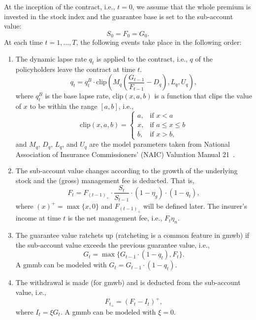 At the inception of the contract, i.e., $t=0$, we assume that the whole premium is invested in the stock index and the guarantee base is set to the sub-account value:
\begin{equation*}
    S_0=F_0=G_0.
\end{equation*}
At each time $t=1,\ldots,T$, the following events take place in the following order:
\begin{enumerate}
    \item The dynamic lapse rate $q_t$ is applied to the contract, i.e., $q$ of the policyholders leave the contract at time $t$.
        \begin{equation} \label{eq3:lapse}
            q_t = q_t^B \cdot \text{clip} (M_q (\frac{G_{t-1}}{F_{t-1}} - D_q), L_q, U_q),
        \end{equation}
    where $q_t^B$ is the base lapse rate, $\text{clip}(x, a, b)$ is a function that clips the value of $x$ to be within the range $[a, b]$, i.e.,
    $$
    \text{clip}(x, a, b) = \begin{cases}
        a, & \text{if } x < a \\
        x, & \text{if } a \leq x \leq b \\
        b, & \text{if } x > b,
    \end{cases}
    $$
    and $M_q$, $D_q$, $L_q$, and $U_q$ are the model parameters taken from National Association of Insurance Commissioners’ (NAIC) Valuation Manual 21~\citep{naic2021}.
    \item The sub-account value changes according to the growth of the underlying stock and the (gross) management fee is deducted. That is, 
        \begin{equation} \label{eq3:subaccount}
            F_t = F_{(t-1)_+}\cdot\frac{S_{t}}{S_{t-1}}\cdot(1-\eta_g)\cdot(1-q_t),
        \end{equation} 
    where $(x)^+=\max\{x,0\}$ and $F_{(t-1)_+}$ will be defined later. The insurer's income at time $t$ is the net management fee, i.e., $F_t\eta_n$. 

    \item The guarantee value ratchets up (ratcheting is a common feature in \gls{gmwb}) if the sub-account value exceeds the previous guarantee value, i.e., 
        \begin{equation} \label{eq3:guarantee}
            G_t = \max\{G_{t-1}\cdot(1-q_t),F_t\}.
        \end{equation} 
    A \gls{gmmb} can be modeled with $G_t = G_{t-1}\cdot(1-q_t)$.

    \item The withdrawal is made (for \gls{gmwb}) and is deducted from the sub-account value, i.e., 
        \begin{equation} \label{eq3:withdrawal}
            F_{t_+} = (F_t - I_t)^+,
        \end{equation} 
    where $I_t = \xi G_t$. A \gls{gmmb} can be modeled with $\xi = 0$.
\end{enumerate}


